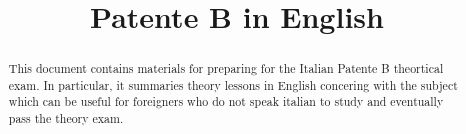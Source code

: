 \documentclass[11pt,a4paper]{report}
\begin{document}
\title{Patente B in English}
\maketitle
\begin{abstract}
  This document contains materials for preparing for the Italian
  Patente B theortical exam.  In particular, it summaries theory
  lessons in English concering with the subject which can be useful
  for foreigners who do not speak italian to study and eventually pass
  the theory exam.
\end{abstract}


\end{document}
